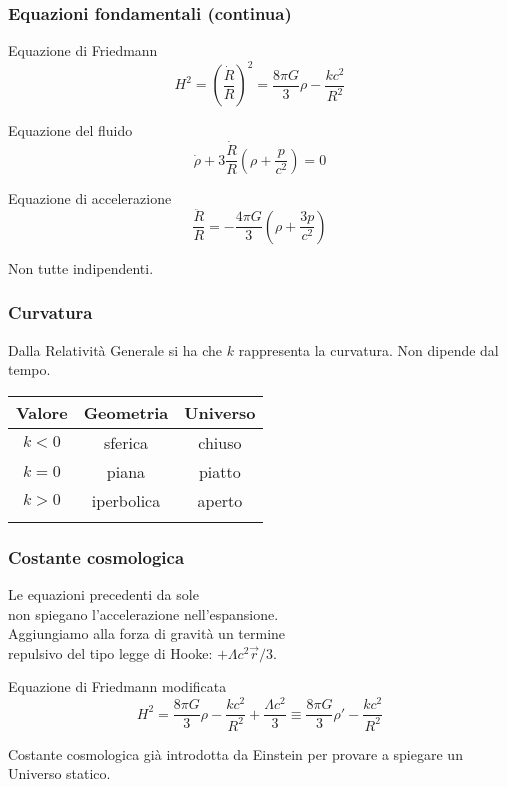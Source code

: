 \begin{frame}
  \frametitle{Equazioni fondamentali (continua)}
  \begin{block}{Equazione di Friedmann}
    \begin{equation*}
      H^2 = \left( \frac{\dot{R}}{R} \right)^2 = \frac{8\pi G}{3}\rho -
      \frac{kc^2}{R^2}
    \end{equation*}
  \end{block}
  \pause{}
  \begin{block}{Equazione del fluido}
    \begin{equation*}
      \dot{\rho} + 3\frac{\dot{R}}{R}\left( \rho + \frac{p}{c^2} \right) = 0
    \end{equation*}
  \end{block}
  \pause{}
  \begin{block}{Equazione di accelerazione}
    \begin{equation*}
    \frac{\ddot{R}}{R} = -\frac{4\pi G}{3}\left( \rho + \frac{3p}{c^2} \right)
  \end{equation*}
  \end{block}
  Non tutte indipendenti.
\end{frame}

\begin{frame}
  \frametitle{Curvatura}
  Dalla Relatività Generale si ha che $k$ rappresenta la curvatura. Non dipende
  dal tempo.
  \begin{table}
    \centering
    \begin{tabular}{ccc}
      \toprule{}
      Valore  & Geometria  & Universo \\
      \midrule{}
      $k < 0$ & sferica    & chiuso   \\
      $k = 0$ & piana      & piatto   \\
      $k > 0$ & iperbolica & aperto   \\
      \bottomrule{}
    \end{tabular}
  \end{table}
\end{frame}

\begin{frame}
  \frametitle{Costante cosmologica}
  Le equazioni precedenti da sole \\
  non spiegano l'accelerazione nell'espansione. \\
  Aggiungiamo alla forza di gravità un termine \\
  repulsivo del tipo legge di Hooke: $+\Lambda c^2\vec{r}/3$.
  \begin{block}{Equazione di Friedmann modificata}
    \begin{equation*}
      H^2 = \frac{8\pi G}{3}\rho - \frac{kc^2}{R^2} + \frac{\Lambda c^2}{3}
      \equiv \frac{8\pi G}{3}\rho' - \frac{kc^2}{R^2}
    \end{equation*}
  \end{block}
  Costante cosmologica già introdotta da Einstein per provare a spiegare un
  Universo statico.
\end{frame}

